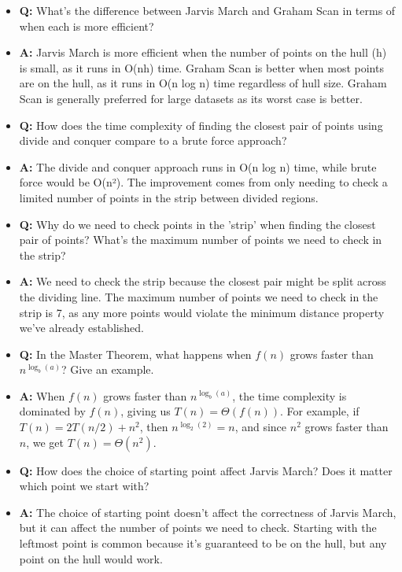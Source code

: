 \documentclass[11pt,a4paper]{article}
\begin{document}
\begin{multicols}{2}
\begin{itemize}
    \item \textbf{Q:} What's the difference between Jarvis March and Graham Scan in terms of when each is more efficient?
    \item \textbf{A:} Jarvis March is more efficient when the number of points on the hull (h) is small, as it runs in O(nh) time. Graham Scan is better when most points are on the hull, as it runs in O(n log n) time regardless of hull size. Graham Scan is generally preferred for large datasets as its worst case is better.

    \item \textbf{Q:} How does the time complexity of finding the closest pair of points using divide and conquer compare to a brute force approach?
    \item \textbf{A:} The divide and conquer approach runs in O(n log n) time, while brute force would be O(n²). The improvement comes from only needing to check a limited number of points in the strip between divided regions.

    \item \textbf{Q:} Why do we need to check points in the 'strip' when finding the closest pair of points? What's the maximum number of points we need to check in the strip?
    \item \textbf{A:} We need to check the strip because the closest pair might be split across the dividing line. The maximum number of points we need to check in the strip is 7, as any more points would violate the minimum distance property we've already established.

    \item \textbf{Q:} In the Master Theorem, what happens when $f(n)$ grows faster than $n^{\log_b(a)}$? Give an example.
    \item \textbf{A:} When $f(n)$ grows faster than $n^{\log_b(a)}$, the time complexity is dominated by $f(n)$, giving us $T(n) = \Theta(f(n))$. For example, if $T(n) = 2T(n/2) + n^2$, then $n^{\log_2(2)} = n$, and since $n^2$ grows faster than $n$, we get $T(n) = \Theta(n^2)$.

    \item \textbf{Q:} How does the choice of starting point affect Jarvis March? Does it matter which point we start with?
    \item \textbf{A:} The choice of starting point doesn't affect the correctness of Jarvis March, but it can affect the number of points we need to check. Starting with the leftmost point is common because it's guaranteed to be on the hull, but any point on the hull would work.


\end{itemize}
\end{multicols}
\end{document}
